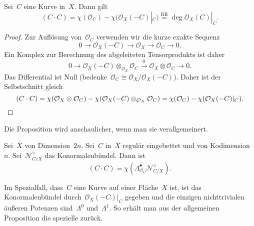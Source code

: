 \documentclass[a4paper,ngerman,12pt]{scrartcl}
\theoremstyle{definition}
\theoremstyle{plain}
\theoremstyle{remark}
\newcommand{\N}{\mathcal{N}}
\renewcommand{\O}{\mathcal{O}}
\newcommand{\lra}{\longrightarrow}
\begin{document}
\begin{prop}Sei~$C$ eine Kurve in~$X$. Dann gilt
\[ (C \cdot C) = \chi(\O_C) - \chi(\O_X(-C)|_C) \stackrel{\mathrm{RR}}{=}
  \deg \O_X(C)|_C. \]
\end{prop}
\begin{proof}
Zur Auflösung von~$\O_C$ verwenden wir die kurze exakte Sequenz
\[ 0 \lra \O_X(-C) \lra \O_X \lra \O_C \lra 0. \]
Ein Komplex zur Berechnung des abgeleiteten Tensorprodukts ist daher
\[ 0 \lra \O_X(-C) \otimes_{\O_X} \O_C \stackrel{0}{\lra} \O_X \otimes \O_C \lra 0. \]
Das Differential ist Null (bedenke~$\O_C \cong \O_X/\O_X(-C)$). Daher ist der
Selbstschnitt gleich
\[ (C \cdot C) = \chi(\O_X \otimes \O_C) - \chi(\O_X(-C) \otimes_{\O_X} \O_C)
  = \chi(\O_C) - \chi(\O_X(-C)|_C). \qedhere \]
\end{proof}

Die Proposition wird anschaulicher, wenn man sie verallgemeinert.

\begin{prop}Sei~$X$ von Dimension~$2n$. Sei~$C$ in~$X$ regulär eingebettet und
von Kodimension~$n$. Sei~$\N_{C/X}^\vee$ das
Konormalenbündel. Dann ist
\[ (C \cdot C) = \chi(\Lambda^\bullet_{\O_C} \N_{C/X}^\vee). \]
\end{prop}

Im Spezialfall, dass~$C$ eine Kurve auf einer Fläche~$X$ ist, ist das
Konormalenbündel durch~$\O_X(-C)|_C$ gegeben und die einzigen nichttrivialen
äußeren Potenzen sind~$\Lambda^0$ und~$\Lambda^1$. So erhält man aus der
allgemeinen Proposition die spezielle zurück.
\end{document}

